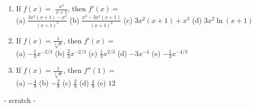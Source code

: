 \documentclass[fleqn,12pt]{article}
\newcommand{\<}{\ensuremath{\langle}}
\renewcommand{\>}{\ensuremath{\rangle}}
\begin{document}
\begin{enumerate}


\item 
If $f(x) =$ {\large $\frac{x^3}{x+1}$}, then $f'(x) = $
\\[10pt] 
(a) {\large $\frac{3x^2(x+1) - x^3}{(x+1)^2}$} \hfill
(b) {\large $\frac{x^3 - 3x^2(x+1)}{(x+1)^2}$} \hfill
(c) $3x^2(x+1) + x^3$ \hfill
(d) $3x^2 \ln(x+1)$

\item 
\label{item:16}
If $f(x) =${\large $\frac{1}{\sqrt[3]{x}}$}, then $f'(x) = $\\[7pt]
(a) $-\frac{1}{3}x^{-2/3}$ \hfill
(b) $\frac{2}{3}x^{-2/3}$ \hfill
(c) $\frac{1}{3}x^{2/3}$ \hfill
(d) $-3x^{-4}$ \hfill
(e) $-\frac{1}{3} x^{-4/3}$


\item 
If $f(x) =${\large $\frac{1}{\sqrt[3]{x}}$}, then $f''(1) = $\\[7pt]
(a) $-\frac{4}{9}$ \hfill
(b)  $-\frac{2}{9}$ \hfill
(c)  $\frac{2}{9}$ \hfill
(d) $\frac{4}{9}$ \hfill
(e) $12$


  \end{enumerate}

\newpage

\begin{center}
  - scratch -
\end{center}
\end{document}
